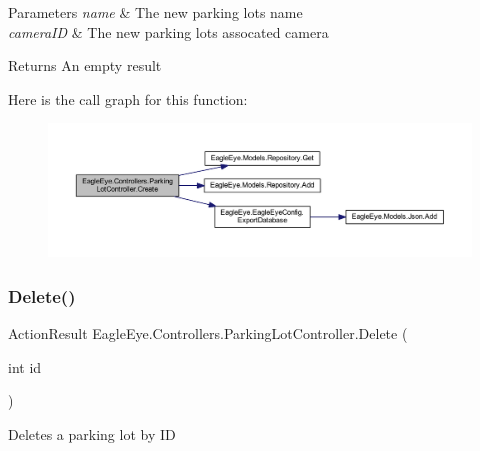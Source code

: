 \begin{DoxyParams}{Parameters}
{\em name} & The new parking lot\textquotesingle{}s name\\
\hline
{\em camera\+ID} & The new parking lot\textquotesingle{}s assocated camera\\
\hline
\end{DoxyParams}
\begin{DoxyReturn}{Returns}
An empty result
\end{DoxyReturn}
Here is the call graph for this function\+:\nopagebreak
\begin{figure}[H]
\begin{center}
\leavevmode
\includegraphics[width=350pt]{class_eagle_eye_1_1_controllers_1_1_parking_lot_controller_a5af6a4b208418bca8a26f30255c62926_cgraph}
\end{center}
\end{figure}
\mbox{\label{class_eagle_eye_1_1_controllers_1_1_parking_lot_controller_aa26300d7c8f2fa2e41c15ceb0eb5c79e}} 
\subsubsection{\texorpdfstring{Delete()}{Delete()}}
{\footnotesize\ttfamily Action\+Result Eagle\+Eye.\+Controllers.\+Parking\+Lot\+Controller.\+Delete (\begin{DoxyParamCaption}\item[{int}]{id }\end{DoxyParamCaption})}



Deletes a parking lot by ID 


